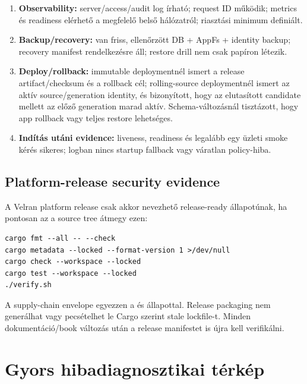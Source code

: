 \begin{enumerate}
  \item \textbf{Observability:} server/access/audit log írható; request ID működik; metrics és readiness elérhető a megfelelő belső hálózatról; riasztási minimum definiált.
  \item \textbf{Backup/recovery:} van friss, ellenőrzött DB + AppFs + identity backup; recovery manifest rendelkezésre áll; restore drill nem csak papíron létezik.
  \item \textbf{Deploy/rollback:} immutable deploymentnél ismert a release artifact/checksum és a rollback cél; rolling-source deploymentnél ismert az aktív source/generation identity, és bizonyított, hogy az elutasított candidate mellett az előző generation marad aktív. Schema-változásnál tisztázott, hogy app rollback vagy teljes restore lehetséges.
  \item \textbf{Indítás utáni evidence:} liveness, readiness és legalább egy üzleti smoke kérés sikeres; logban nincs startup fallback vagy váratlan policy-hiba.
\end{enumerate}

\subsection*{Platform-release security evidence}

A Velran platform release csak akkor nevezhető release-ready állapotúnak, ha pontosan az a source tree átmegy ezen:

\begin{lstlisting}
cargo fmt --all -- --check
cargo metadata --locked --format-version 1 >/dev/null
cargo check --workspace --locked
cargo test --workspace --locked
./verify.sh
\end{lstlisting}

A supply-chain envelope egyezzen a  és  állapottal. Release packaging nem generálhat vagy pecsételhet le Cargo szerint stale lockfile-t. Minden dokumentáció/book változás után a release manifestet is újra kell verifikálni.

\section{Gyors hibadiagnosztikai térkép}

